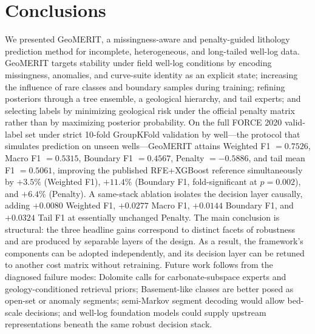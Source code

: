 \documentclass[bdcc,article,submit,pdftex,moreauthors]{Definitions/mdpi}
\begin{document}
\section{Conclusions}
\label{sec:conclusion}
We presented GeoMERIT, a missingness-aware and penalty-guided lithology prediction method for
incomplete, heterogeneous, and long-tailed well-log data. GeoMERIT targets stability under
field well-log conditions by encoding missingness, anomalies, and curve-suite identity as an
explicit state; increasing the influence of rare classes and boundary samples during training;
refining posteriors through a tree ensemble, a geological hierarchy, and tail experts; and
selecting labels by minimizing geological risk under the official penalty matrix rather than by
maximizing posterior probability. On the full FORCE 2020 valid-label set under strict 10-fold
GroupKFold validation by well---the protocol that simulates prediction on unseen wells---GeoMERIT
attains Weighted F1 $=0.7526$, Macro F1 $=0.5315$, Boundary F1 $=0.4567$, Penalty $=-0.5886$,
and tail mean F1 $=0.5061$, improving the published RFE+XGBoost reference simultaneously by
$+3.5\%$ (Weighted F1), $+11.4\%$ (Boundary F1, fold-significant at $p=0.002$), and $+6.4\%$
(Penalty). A same-stack ablation isolates the decision layer causally, adding $+0.0080$
Weighted F1, $+0.0277$ Macro F1, $+0.0144$ Boundary F1, and $+0.0324$ Tail F1 at essentially
unchanged Penalty. The main conclusion is structural: the three headline gains correspond to
distinct facets of robustness and are produced by separable layers of the design. As a result,
the framework's components can be adopted independently, and its decision layer can be retuned
to another cost matrix without retraining. Future work follows from the diagnosed failure modes:
Dolomite calls for carbonate-subspace experts and geology-conditioned retrieval priors;
Basement-like classes are better posed as open-set or anomaly segments; semi-Markov segment
decoding would allow bed-scale decisions; and well-log foundation models could supply upstream
representations beneath the same robust decision stack.

\vspace{6pt}


\end{document}
